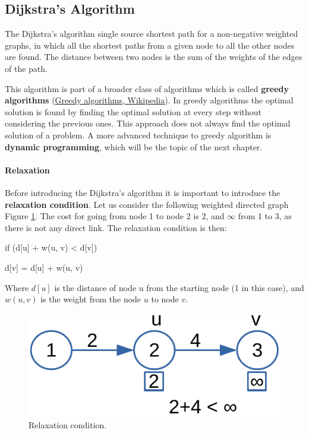 \subsection{Dijkstra's Algorithm}
The Dijkstra's algorithm single source shortest path for a non-negative weighted graphs, in which all the shortest paths from a given node to all the other nodes are found. The distance between two nodes is the sum of the weights of the edges of the path.

This algorithm is part of a broader class of algorithms which is called \textbf{greedy algorithms} \cite{wikigreedy} (\href{https://en.wikipedia.org/wiki/Greedy_algorithm}{Greedy algorithms, Wikipedia}). In greedy algorithms the optimal solution is found by finding the optimal solution at every step without considering the previous ones. This approach does not always find the optimal solution of a problem. A more advanced technique to greedy algorithm is \textbf{dynamic programming}, which will be the topic of the next chapter.

\paragraph{Relaxation}
Before introducing the Dijkstra's algorithm it is important to introduce the \textbf{relaxation condition}. Let us consider the following weighted directed graph Figure \ref{graphs_12}. The cost for going from node 1 to node 2 is \(2\), and \(\infty\) from 1 to 3, as there is not any direct link. The relaxation condition is then:

\begin{definition}
\enspace \enspace \textnormal{if (d[u] + w(u, v) < d[v])}

\enspace \enspace \enspace     \textnormal{d[v] = d[u] + w(u, v)}

Where \(d[u]\) is the distance of node u from the starting node (1 in this case), and \(w(u, v)\) is the weight from the node \(u\) to node \(v\).
\end{definition}

\begin{figure}[H]
	\begin{center}
		\includegraphics[scale=.6]{chapters/graphs/images/graphs_12.pdf}
		\caption[Relaxation condition.]{Relaxation condition.}
		\label{graphs_12}
	\end{center}
\end{figure}

